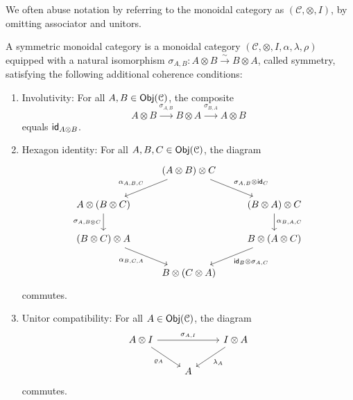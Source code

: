 We often abuse notation by referring to the monoidal category as $(\mathcal{C}, \otimes, I)$, by omitting associator and unitors. 
\begin{definition}
A {symmetric monoidal category} is a monoidal category $(\mathcal{C}, \otimes, I, \alpha, \lambda, \rho)$ equipped with a natural isomorphism $\sigma_{A,B} \colon A \otimes B \xrightarrow{\sim} B \otimes A$, called symmetry, satisfying the following additional coherence conditions:  
\begin{enumerate}  
    \item {Involutivity}: For all $A,B \in \mathsf{Obj}(\mathcal{C})$, the composite  
    \[  
    A \otimes B \xrightarrow{\sigma_{A,B}} B \otimes A \xrightarrow{\sigma_{B,A}} A \otimes B  
    \]  
    equals $\mathsf{id}_{A \otimes B}$.  

    \item {Hexagon identity}: For all $A,B,C \in\mathsf{Obj}(\mathcal{C})$, the diagram  
    \[\begin{tikzcd}  
        & (A \otimes B) \otimes C \arrow[dl, "\alpha_{A,B,C}"'] \arrow[dr, "\sigma_{A,B} \otimes \id_C"] \\  
        A \otimes (B \otimes C) \arrow[d, "\sigma_{A,B \otimes C}"'] & & (B \otimes A) \otimes C \arrow[d, "\alpha_{B,A,C}"] \\  
        (B \otimes C) \otimes A \arrow[dr, "\alpha_{B,C,A}"'] & & B \otimes (A \otimes C) \arrow[dl, "\id_B \otimes \sigma_{A,C}"] \\  
        & B \otimes (C \otimes A) &  
    \end{tikzcd}\]  
    commutes.  

    \item {Unitor compatibility}: For all $A \in\mathsf{Obj}(\mathcal{C})$, the diagram  
    \[\begin{tikzcd}  
        A \otimes I \arrow[rr, "\sigma_{A,I}"] \arrow[dr, "\rho_A"'] & & I \otimes A \arrow[dl, "\lambda_A"] \\  
        & A &  
    \end{tikzcd}\]  
    commutes.  
\end{enumerate}   
\end{definition}
